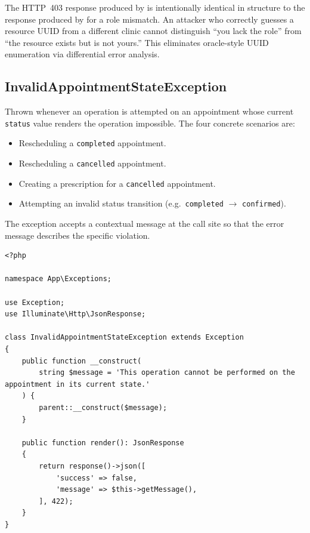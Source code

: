 \begin{warningbox}
  The HTTP~403 response produced by 
  is intentionally identical in structure to the response produced by
   for a role mismatch. An attacker who
  correctly guesses a resource UUID from a different clinic cannot
  distinguish ``you lack the role'' from ``the resource exists but is
  not yours.'' This eliminates oracle-style UUID enumeration via
  differential error analysis.
\end{warningbox}

\subsection{InvalidAppointmentStateException}
\label{sec:ex-invalid-state}

Thrown whenever an operation is attempted on an appointment whose
current \texttt{status} value renders the operation impossible. The
four concrete scenarios are:

\begin{itemize}
  \item Rescheduling a \texttt{completed} appointment.
  \item Rescheduling a \texttt{cancelled} appointment.
  \item Creating a prescription for a \texttt{cancelled} appointment.
  \item Attempting an invalid status transition (e.g.\
    \texttt{completed} $\to$ \texttt{confirmed}).
\end{itemize}

The exception accepts a contextual message at the call site so that the
error message describes the specific violation.

\begin{lstlisting}[style=php, caption={\texttt{app/Exceptions/InvalidAppointmentStateException.php}.}]
<?php

namespace App\Exceptions;

use Exception;
use Illuminate\Http\JsonResponse;

class InvalidAppointmentStateException extends Exception
{
    public function __construct(
        string $message = 'This operation cannot be performed on the appointment in its current state.'
    ) {
        parent::__construct($message);
    }

    public function render(): JsonResponse
    {
        return response()->json([
            'success' => false,
            'message' => $this->getMessage(),
        ], 422);
    }
}
\end{lstlisting}

